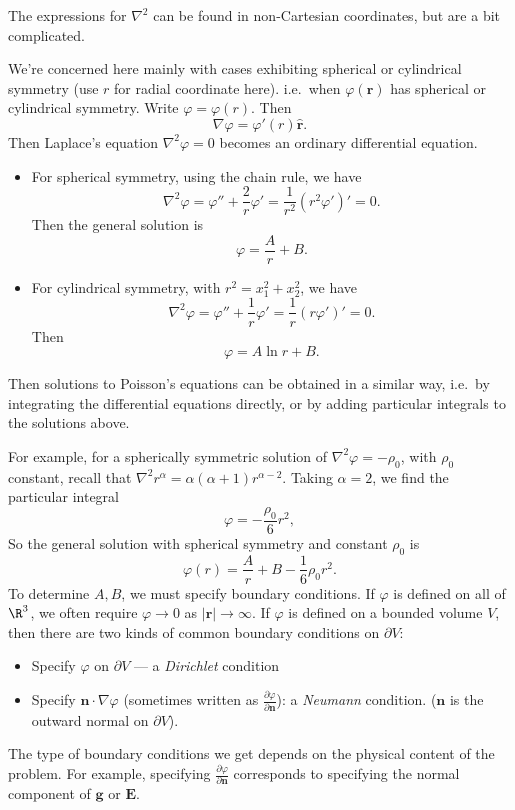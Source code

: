 \documentclass[a4paper]{article}
\begin{document}
The expressions for $\nabla^2$ can be found in non-Cartesian coordinates, but are a bit complicated.

We're concerned here mainly with cases exhibiting spherical or cylindrical symmetry (use $r$ for radial coordinate here). i.e.\ when $\varphi(\mathbf{r})$ has spherical or cylindrical symmetry. Write $\varphi = \varphi(r)$. Then
\[
  \nabla \varphi = \varphi'(r)\hat{\mathbf{r}}.
\]
Then Laplace's equation $\nabla^2 \varphi = 0$ becomes an ordinary differential equation.
\begin{itemize}
  \item For spherical symmetry, using the chain rule, we have
    \[
      \nabla^2 \varphi = \varphi'' + \frac{2}{r}\varphi' = \frac{1}{r^2}(r^2\varphi')' = 0.
    \]
    Then the general solution is
    \[
      \varphi = \frac{A}{r} + B.
    \]
  \item For cylindrical symmetry, with $r^2 = x_1^2 + x_2^2$, we have
    \[
      \nabla^2 \varphi = \varphi'' + \frac{1}{r}\varphi' = \frac{1}{r}(r\varphi')' = 0.
    \]
    Then
    \[
      \varphi = A\ln r + B.
    \]
\end{itemize}
Then solutions to Poisson's equations can be obtained in a similar way, i.e.\ by integrating the differential equations directly, or by adding particular integrals to the solutions above.

For example, for a spherically symmetric solution of $\nabla^2 \varphi = -\rho_0$, with $\rho_0$ constant, recall that $\nabla^2 r^\alpha = \alpha(\alpha + 1)r^{\alpha - 2}$. Taking $\alpha = 2$, we find the particular integral
\[
  \varphi = -\frac{\rho_0}{6}r^2,
\]
So the general solution with spherical symmetry and constant $\rho_0$ is
\[
  \varphi(r) = \frac{A}{r} + B - \frac{1}{6}\rho_0 r^2.
\]
To determine $A, B$, we must specify boundary conditions. If $\varphi$ is defined on all of $\R^3$, we often require $\varphi \to 0$ as $|\mathbf{r}| \to \infty$. If $\varphi$ is defined on a bounded volume $V$, then there are two kinds of common boundary conditions on $\partial V$:
\begin{itemize}
  \item Specify $\varphi$ on $\partial V$ --- a \emph{Dirichlet} condition
  \item Specify $\mathbf{n}\cdot \nabla \varphi$ (sometimes written as $\frac{\partial \varphi}{\partial \mathbf{n}}$): a \emph{Neumann} condition. ($\mathbf{n}$ is the outward normal on $\partial V$).
\end{itemize}
The type of boundary conditions we get depends on the physical content of the problem. For example, specifying $\frac{\partial \varphi}{\partial \mathbf{n}}$ corresponds to specifying the normal component of $\mathbf{g}$ or $\mathbf{E}$.
\end{document}
